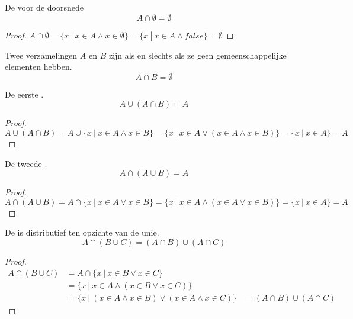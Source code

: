 \documentclass[main.tex]{subfiles}
\begin{document}
\begin{st}
  De  voor de doorsnede
  \[ A \cap \emptyset = \emptyset \]
  \begin{proof}
    $A \cap \emptyset = \{ x\ |\ x \in A \wedge x \in \emptyset \} = \{ x\ |\ x \in A \wedge false \} = \emptyset$
  \end{proof}
\end{st}
\begin{de}
  Twee verzamelingen $A$ en $B$ zijn  als en slechts als ze geen gemeenschappelijke elementen hebben.
  \[ A \cap B = \emptyset \]
\end{de}

\begin{st}
  De eerste .
  \[ A \cup ( A \cap B ) = A\]

  \begin{proof}
    $A \cup ( A \cap B ) = A \cup \{ x\ |\ x \in A \wedge x \in B\} = \{ x\ |\ x\in A \vee (x \in A \wedge x \in B) \} = \{ x\ |\ x \in A \} = A$
  \end{proof}
\end{st}

\begin{st}
  De tweede .
  \[ A \cap ( A \cup B ) = A\]

  \begin{proof}
    $A \cap ( A \cup B ) = A \cap \{ x\ |\ x \in A \vee x \in B\} = \{ x\ |\ x\in A \wedge (x \in A \vee x \in B) \} = \{ x\ |\ x \in A \} = A$
  \end{proof}
\end{st}

\begin{st}
  De  is distributief ten opzichte van de unie.
  \[ A \cap ( B \cup C ) = (A \cap B) \cup (A \cap C) \]

  \begin{proof}
    \[
    \begin{array}{rll}
      A \cap ( B \cup C ) &= A \cap \{ x\ |\ x \in B \vee x \in C \}&\\
                          &= \{ x\ |\ x \in A \wedge (x \in B \vee x \in C) \}&\\
                          &= \{ x\ |\ (x \in A \wedge x\in B) \vee (x \in A \wedge x \in C) \} &= (A \cap B) \cup (A \cap C)      
    \end{array}
    \]
  \end{proof}
\end{st}
\end{document}
